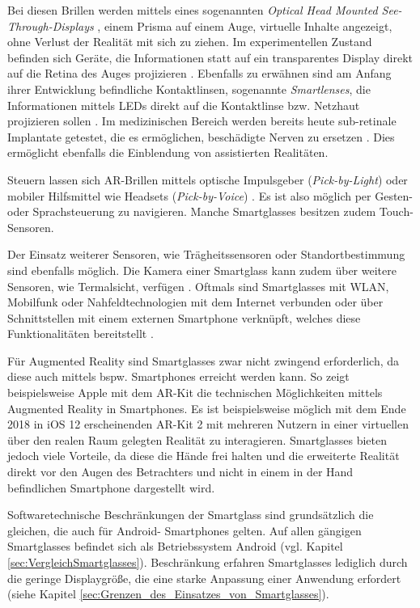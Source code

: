 Bei diesen Brillen werden mittels eines sogenannten \emph{Optical Head Mounted See-Through-Displays} \cite[S.~26]{Schwenke2016}, einem Prisma auf einem Auge, virtuelle Inhalte angezeigt, ohne Verlust der Realität mit sich zu ziehen. Im experimentellen Zustand befinden sich Geräte, die Informationen statt auf ein transparentes Display direkt auf die Retina des Auges projizieren \cite[S.~241]{Broll2013}. Ebenfalls zu erwähnen sind am Anfang ihrer Entwicklung befindliche Kontaktlinsen, sogenannte \emph{Smartlenses}, die Informationen mittels LEDs direkt auf die Kontaktlinse bzw. Netzhaut projizieren sollen \cite{Donath2014, Schwan2014}. Im medizinischen Bereich werden bereits heute sub-retinale Implantate getestet, die es ermöglichen, beschädigte Nerven zu ersetzen \cite{Young2013}. Dies ermöglicht ebenfalls die Einblendung von assistierten Realitäten.

Steuern lassen sich AR-Brillen mittels optische Impulsgeber (\emph{Pick-by-Light}) oder mobiler Hilfsmittel wie Headsets (\emph{Pick-by-Voice}) \cite{INTRALOGISTIK2016}. Es ist also möglich per Gesten- oder Sprachsteuerung zu navigieren. Manche Smartglasses besitzen zudem Touch-Sensoren.

Der Einsatz weiterer Sensoren, wie Trägheitssensoren oder Standortbestimmung sind ebenfalls möglich. Die Kamera einer Smartglass kann zudem über weitere Sensoren, wie Termalsicht, verfügen \cite[S.~27]{Schwenke2016}. Oftmals sind Smartglasses mit WLAN, Mobilfunk oder Nahfeldtechnologien mit dem Internet verbunden oder über Schnittstellen mit einem externen Smartphone verknüpft, welches diese Funktionalitäten bereitstellt \cite[S.~28]{Schwenke2016}.

Für Augmented Reality sind Smartglasses zwar nicht zwingend erforderlich, da diese auch mittels bspw. Smartphones erreicht werden kann. So zeigt beispielsweise Apple mit dem AR-Kit \cite{Apple2018} die technischen Möglichkeiten mittels Augmented Reality in Smartphones. Es ist beispielsweise möglich mit dem Ende 2018 in iOS 12 erscheinenden AR-Kit 2 mit mehreren Nutzern in einer virtuellen über den realen Raum gelegten Realität zu interagieren. Smartglasses bieten jedoch viele Vorteile, da diese die Hände frei halten und die erweiterte Realität direkt vor den Augen des Betrachters und nicht in einem in der Hand befindlichen Smartphone dargestellt wird.

Softwaretechnische Beschränkungen der Smartglass sind grundsätzlich die gleichen, die auch für Android- Smartphones gelten. Auf allen gängigen Smartglasses befindet sich als Betriebssystem Android (vgl. Kapitel \ref{sec:VergleichSmartglasses}). Beschränkung erfahren Smartglasses lediglich durch die geringe Displaygröße, die eine starke Anpassung einer Anwendung erfordert (siehe Kapitel \ref{sec:Grenzen_des_Einsatzes_von_Smartglasses}).
%
%
%
%
%
%
